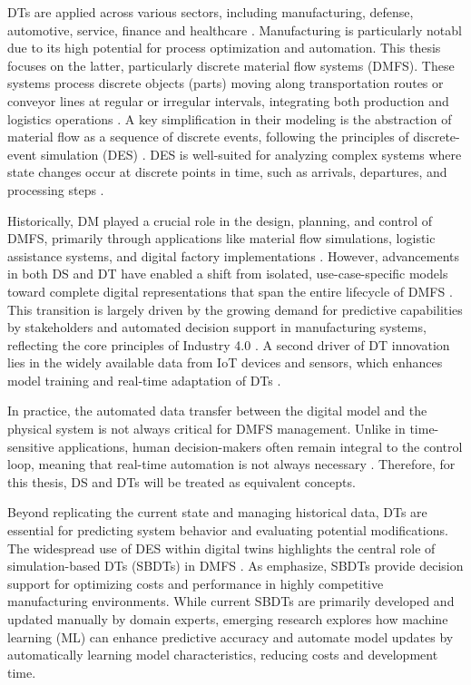 DTs are applied across various sectors, including manufacturing, defense, automotive, service, finance and healthcare \autocite{Tao2018ijamt}. Manufacturing is particularly notabl due to its high potential for process optimization and automation. This thesis focuses on the latter, particularly discrete material flow systems (DMFS). These systems process discrete objects (parts) moving along transportation routes or conveyor lines at regular or irregular intervals, integrating both production and logistics operations \autocite{arnold2005materialfluss, schwede2024learning}. A key simplification in their modeling is the abstraction of material flow as a sequence of discrete events, following the principles of discrete-event simulation (DES) \autocite{kovacs2016mathematical, robinson2014simulation}. DES is well-suited for analyzing complex systems where state changes occur at discrete points in time, such as arrivals, departures, and processing steps \autocite{robinson2014simulation}.

Historically, DM played a crucial role in the design, planning, and control of DMFS, primarily through applications like material flow simulations, logistic assistance systems, and digital factory implementations \autocite{Thiede2013}. However, advancements in both DS and DT have enabled a shift from isolated, use-case-specific models toward complete digital representations that span the entire lifecycle of DMFS \autocite{Abdoune2023}. This transition is largely driven by the growing demand for predictive capabilities by stakeholders and automated decision support in manufacturing systems, reflecting the core principles of Industry 4.0 \autocite{frank2019industry}. A second driver of DT innovation lies in the widely available data from IoT devices and sensors, which enhances model training and real-time adaptation of DTs \autocite{Tao2018ijamt}.

In practice, the automated data transfer between the digital model and the physical system is not always critical for DMFS management. Unlike in time-sensitive applications, human decision-makers often remain integral to the control loop, meaning that real-time automation is not always necessary \autocite{schwede2024learning}. Therefore, for this thesis, DS and DTs will be treated as equivalent concepts.

Beyond replicating the current state and managing historical data, DTs are essential for predicting system behavior and evaluating potential modifications. The widespread use of DES within digital twins highlights the central role of simulation-based DTs (SBDTs) in DMFS \autocite{Lugaresi2021aifac}. As \citeauthor{schwede2024learning} emphasize, SBDTs provide decision support for optimizing costs and performance in highly competitive manufacturing environments. While current SBDTs are primarily developed and updated manually by domain experts, emerging research explores how machine learning (ML) can enhance predictive accuracy and automate model updates by automatically learning model characteristics, reducing costs and development time.

